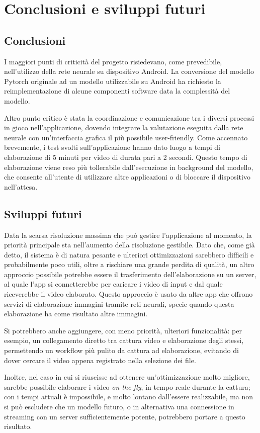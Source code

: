 \chapter{Conclusioni e sviluppi futuri}

\section{Conclusioni}

I maggiori punti di criticità del progetto risiedevano, come prevedibile, nell'utilizzo della rete neurale su dispositivo
Android. La conversione del modello Pytorch originale ad un modello utilizzabile su Android ha richiesto la reimplementazione
di alcune componenti software data la complessità del modello.

Altro punto critico è stata la coordinazione e comunicazione tra i diversi processi in gioco nell'applicazione, dovendo
integrare la valutazione eseguita dalla rete neurale con un'interfaccia grafica il più possibile user-friendly.
Come accennato brevemente, i test svolti sull'applicazione hanno dato luogo a tempi di elaborazione di 5 minuti per 
video di durata pari a 2 secondi. Questo tempo di elaborazione viene reso più tollerabile dall'esecuzione in background
del modello, che consente all'utente di utilizzare altre applicazioni o di bloccare il dispositivo nell'attesa.

\section{Sviluppi futuri}
\label{sec:sviluppi-futuri}

Data la scarsa risoluzione massima che può gestire l'applicazione al momento, la priorità
principale sta nell'aumento della risoluzione gestibile. Dato che, come già detto, il sistema è
di natura pesante e ulteriori ottimizzazioni sarebbero difficili e probabilmente poco utili, 
oltre a rischiare una grande perdita di qualità, un altro approccio possibile potrebbe essere
il trasferimento dell'elaborazione su un server, al quale l'app si connetterebbe per caricare i
video di input e dal quale riceverebbe il video elaborato. Questo approccio è usato da altre app
che offrono servizi di elaborazione immagini tramite reti neurali, specie quando questa 
elaborazione ha come risultato altre immagini.

Si potrebbero anche aggiungere, con meno priorità, ulteriori funzionalità: per esempio, un
collegamento diretto tra cattura video e elaborazione degli stessi, permettendo un workflow più
pulito da cattura ad elaborazione, evitando di dover cercare il video appena registrato nella
selezione dei file.

Inoltre, nel caso in cui si riuscisse ad ottenere un'ottimizzazione molto migliore, sarebbe 
possibile elaborare i video \emph{on the fly}, in tempo reale durante la cattura; con i tempi
attuali è impossibile, e molto lontano dall'essere realizzabile, ma non si può escludere che un
modello futuro, o in alternativa una connessione in streaming con un server sufficientemente
potente, potrebbero portare a questo risultato.